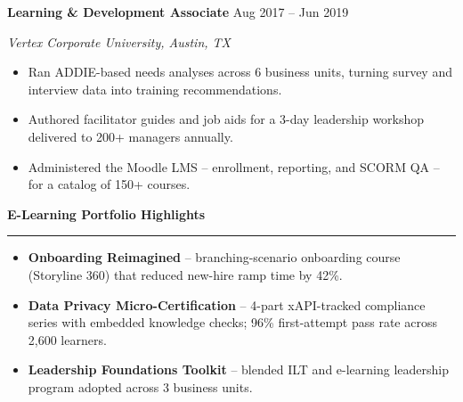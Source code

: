 \documentclass[10pt]{article}
\newcommand{\sidetitle}[1]{%
  {\color{accent}\bfseries\fontsize{10.5}{12}\selectfont #1}\par
  \vspace{1pt}
  {\color{accent}\rule{\linewidth}{0.9pt}}\par
  \vspace{3pt}
}
\newcommand{\jobheader}[3]{%
  {\color{darktext}\bfseries #1} \hfill {\color{graytext}\small #3}\par
  {\color{accent}\itshape\small #2}\par
  \vspace{2pt}
}
\begin{document}
\begin{minipage}[t]{0.645\textwidth}
\vspace{6pt}
\jobheader{Learning \& Development Associate}{Vertex Corporate University, Austin, TX}{Aug 2017 -- Jun 2019}
\begin{itemize}[leftmargin=12pt, itemsep=2pt, topsep=0pt, parsep=0pt, label={\small\color{accent}\textbullet}]
  \item \small Ran ADDIE-based needs analyses across 6 business units, turning survey and interview data into training recommendations.
  \item \small Authored facilitator guides and job aids for a 3-day leadership workshop delivered to 200+ managers annually.
  \item \small Administered the Moodle LMS -- enrollment, reporting, and SCORM QA -- for a catalog of 150+ courses.
\end{itemize}

\vspace{9pt}
\sidetitle{E-Learning Portfolio Highlights}
\begin{itemize}[leftmargin=12pt, itemsep=3pt, topsep=0pt, parsep=0pt, label={\small\color{accent}\textbullet}]
  \item \small \textbf{Onboarding Reimagined} -- branching-scenario onboarding course (Storyline 360) that reduced new-hire ramp time by 42\%.
  \item \small \textbf{Data Privacy Micro-Certification} -- 4-part xAPI-tracked compliance series with embedded knowledge checks; 96\% first-attempt pass rate across 2,600 learners.
  \item \small \textbf{Leadership Foundations Toolkit} -- blended ILT and e-learning leadership program adopted across 3 business units.
\end{itemize}

\end{minipage}
\par
\end{document}

